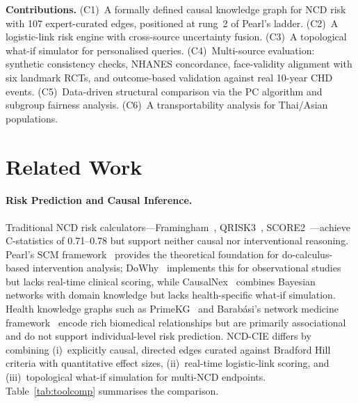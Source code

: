 \documentclass[runningheads]{llncs}
\begin{document}
\noindent\textbf{Contributions.}
(C1)~A formally defined causal knowledge graph for NCD risk with 107
expert-curated edges, positioned at rung~2 of Pearl's ladder.
(C2)~A logistic-link risk engine with cross-source uncertainty fusion.
(C3)~A topological what-if simulator for personalised queries.
(C4)~Multi-source evaluation: synthetic consistency checks, NHANES
concordance, face-validity alignment with six landmark RCTs,
and outcome-based validation against real 10-year CHD events.
(C5)~Data-driven structural comparison via the PC algorithm and
subgroup fairness analysis.
(C6)~A transportability analysis for Thai/Asian populations.

\section{Related Work}\label{sec:related}

\paragraph{Risk Prediction and Causal Inference.}
Traditional NCD risk calculators---Framingham~\cite{dagostino2008},
QRISK3~\cite{hippisley2017qrisk3}, SCORE2~\cite{score22021}---achieve
C-statistics of 0.71--0.78 but support neither causal nor
interventional reasoning.
Pearl's SCM framework~\cite{pearl2009causality} provides the
theoretical foundation for do-calculus-based intervention analysis;
DoWhy~\cite{sharma2020dowhy} implements this for observational studies
but lacks real-time clinical scoring, while
CausalNex~\cite{beaumont2021causalnex} combines Bayesian networks
with domain knowledge but lacks health-specific what-if simulation.
Health knowledge graphs such as
PrimeKG~\cite{chandak2023primekg} and Barab\'{a}si's network
medicine framework~\cite{barabasi2011network} encode rich biomedical
relationships but are primarily associational and do not support
individual-level risk prediction.
NCD-CIE differs by combining (i)~explicitly causal, directed edges
curated against Bradford Hill criteria with quantitative effect sizes,
(ii)~real-time logistic-link scoring, and (iii)~topological what-if
simulation for multi-NCD endpoints.
Table~\ref{tab:toolcomp} summarises the comparison.
\end{document}
